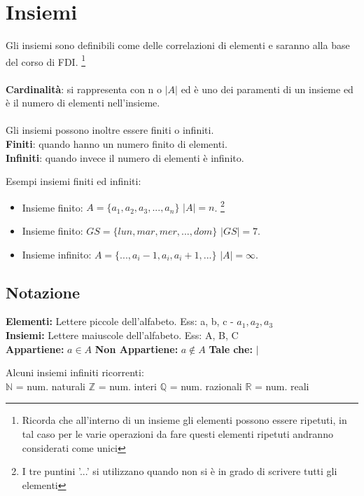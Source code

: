 \section{Insiemi}
Gli insiemi sono definibili come delle correlazioni di elementi e saranno alla base del corso di FDI. \footnote{Ricorda che all'interno di un insieme gli elementi possono essere ripetuti, in tal caso per le varie operazioni da fare questi elementi ripetuti andranno considerati come unici} \\ \\
\textbf{Cardinalità}: si rappresenta con n o \(|A|\) ed è uno dei paramenti di un insieme ed è il numero di elementi nell'insieme. \\ \\
Gli insiemi possono inoltre essere finiti o infiniti.\\
\textbf{Finiti}: quando hanno un numero finito di elementi.\\
\textbf{Infiniti}: quando invece il numero di elementi è infinito.
\begin{example}
Esempi insiemi finiti ed infiniti:
\begin{itemize}
    \item Insieme finito: \(A = \{a_1, a_2, a_3, ..., a_n \}\) \(|A| = n\). \footnote{I tre puntini '...' si utilizzano quando non si è in grado di scrivere tutti gli elementi}
    \item Insieme finito: \(GS = \{lun, mar, mer, ..., dom\}\) \(|GS| = 7\).
    \item Insieme infinito: \(A = \{..., a_i-1, a_i, a_i+1, ...\}\) \(|A| = \infty\).
\end{itemize}
\end{example}

\subsection{Notazione}
\textbf{Elementi:} Lettere piccole dell'alfabeto. Ess: a, b, c - \(a_1, a_2, a_3\) \\
\textbf{Insiemi:} Lettere maiuscole dell'alfabeto. Ess: A, B, C \\
\textbf{Appartiene:} \(a \in A\) \hspace { 1cm } \textbf{Non Appartiene:} \(a \notin A\) \hspace { 1cm } \textbf{Tale che:} $|$ 
\begin{example}
Alcuni insiemi infiniti ricorrenti:\\
\(\mathbb{N}\) = num. naturali \hspace{.5cm} \(\mathbb{Z}\) = num. interi \hspace{.5cm} \(\mathbb{Q}\) = num. razionali \hspace{.5cm} \(\mathbb{R}\) = num. reali
\end{example}

